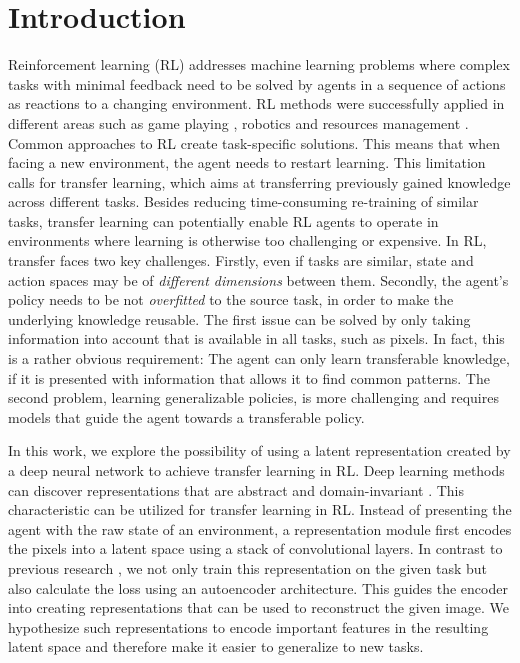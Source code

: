 \section{Introduction}
\label{sec:introduction}

Reinforcement learning (RL) addresses machine learning problems where complex tasks with minimal feedback \citep{taylor2007cross} need to be solved by agents in a sequence of actions as reactions to a changing environment. RL methods were successfully applied in different areas such as game playing \citep{silver2016mastering}, robotics \citep{levine2016end} and resources management \citep{mao2016resource}. 
Common approaches to RL create task-specific solutions. This means that when facing a new environment, the agent needs to restart learning. This limitation calls for transfer learning, which aims at transferring previously gained knowledge across different tasks. Besides reducing time-consuming re-training of similar tasks, transfer learning can potentially enable RL agents to operate in environments where learning is otherwise too challenging \citep{barreto2018transfer} or expensive. In RL, transfer faces two key challenges. Firstly, even if tasks are similar, state and action spaces may be of \textit{different dimensions} between them. Secondly, the agent's policy needs to be not \textit{overfitted} to the source task, in order to make the underlying knowledge reusable. %
The first issue can be solved by only taking information into account that is available in all tasks, such as pixels. In fact, this is a rather obvious requirement: The agent can only learn transferable knowledge, if it is presented with information that allows it to find common patterns. The second problem, learning generalizable policies, is more challenging and requires models that guide the agent towards a transferable policy. 

In this work, we explore the possibility of using a latent representation created by a deep neural network to achieve transfer learning in RL. Deep learning methods can discover representations that are abstract and domain-invariant \citep{bengio2012deep, ganin2014unsupervised}. This characteristic can be utilized for transfer learning in RL. Instead of presenting the agent with the raw state of an environment, a representation module first encodes the pixels into a latent space using a stack of convolutional layers. In contrast to previous research \citep[see e.g.][]{DQN, DuelingDQN}, we not only train this representation on the given task but also calculate the loss using an autoencoder architecture. This guides the encoder into creating representations that can be used to reconstruct the given image. We hypothesize such representations to encode important features in the resulting latent space and therefore make it easier to generalize to new tasks.

